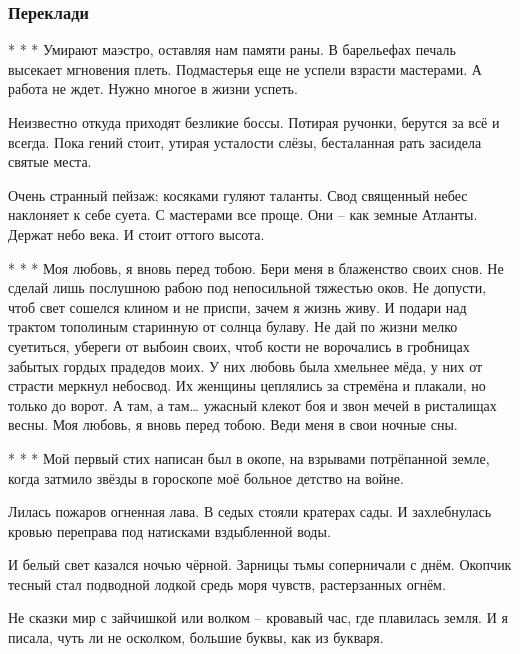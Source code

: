 
 
 

\subsubsection{Переклади}


* * *
Умирают маэстро, оставляя нам памяти раны.
В барельефах печаль высекает мгновения плеть.
Подмастерья еще не успели взрасти мастерами.
А работа не ждет. Нужно многое в жизни успеть.
 
Неизвестно откуда приходят безликие боссы.
Потирая ручонки, берутся за всё и всегда.
Пока гений стоит, утирая усталости слёзы,
бесталанная рать засидела святые места.

Очень странный пейзаж: косяками гуляют таланты.
Свод священный небес наклоняет к себе суета.
С мастерами все проще. Они – как земные Атланты.
Держат небо века. И стоит оттого высота.

* * *
Моя любовь, я вновь перед тобою.
Бери меня в блаженство своих снов.
Не сделай лишь послушною рабою
под непосильной тяжестью оков.
Не допусти, чтоб свет сошелся клином
и не приспи, зачем я жизнь живу.
И подари над трактом тополиным
старинную от солнца булаву.
Не дай по жизни мелко суетиться,
убереги от выбоин своих,
чтоб кости не ворочались в гробницах
забытых гордых прадедов моих.
У них любовь была хмельнее мёда,
у них от страсти меркнул  небосвод.
Их женщины цеплялись за стремёна
и плакали, но только до ворот.
А там, а там… ужасный клекот боя
и звон мечей в ристалищах весны. 
Моя любовь, я вновь перед тобою.
Веди меня в свои ночные сны.

* * *
Мой первый стих написан был в окопе,
на взрывами потрёпанной земле,
когда затмило звёзды в гороскопе
моё больное детство на войне.

Лилась пожаров огненная лава.
В седых стояли кратерах сады.
И захлебнулась кровью переправа
под натисками вздыбленной воды.

И белый свет казался ночью чёрной.
Зарницы тьмы соперничали с днём.
Окопчик тесный стал подводной лодкой
средь моря чувств, растерзанных огнём.

Не сказки  мир с зайчишкой или волком –
кровавый час, где плавилась земля.
И я писала, чуть ли не осколком,
большие буквы, как из букваря.


